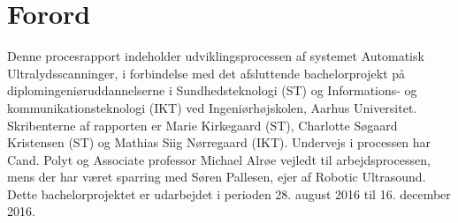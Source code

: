 \chapter{Forord}\label{kapForord}
Denne procesrapport indeholder udviklingsprocessen af systemet Automatisk Ultralydsscanninger, i forbindelse med det afsluttende bachelorprojekt på diplomingeniøruddannelserne i Sundhedsteknologi (ST) og Informations- og kommunikationsteknologi (IKT) ved Ingeniørhøjskolen, Aarhus Universitet. Skribenterne af rapporten er Marie Kirkegaard (ST), Charlotte Søgaard Kristensen (ST) og Mathias Siig Nørregaard (IKT). Undervejs i processen har Cand. Polyt og Associate professor Michael Alrøe vejledt til arbejdsprocessen, mens der har været sparring med Søren Pallesen, ejer af Robotic Ultrasound. Dette bachelorprojektet er udarbejdet i perioden 28. august 2016 til 16. december 2016.
